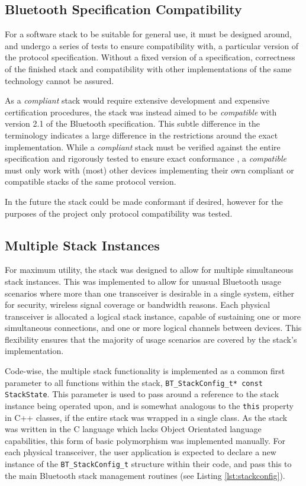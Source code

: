 \FloatBarrier
\subsection{Bluetooth Specification Compatibility}

For a software stack to be suitable for general use, it must be designed around, and undergo a series of tests to ensure compatibility with, a particular version of the protocol specification. Without a fixed version of a specification, correctness of the finished stack and compatibility with other implementations of the same technology cannot be assured.

As a \textit{compliant} stack would require extensive development and expensive certification procedures, the stack was instead aimed to be \textit{compatible} with version 2.1 of the Bluetooth specification. This subtle difference in the terminology indicates a large difference in the restrictions around the exact implementation. While a \textit{compliant} stack must be verified against the entire specification and rigorously tested to ensure exact conformance \cite{bt2p1specs_conformance}, a \textit{compatible} must only work with (most) other devices implementing their own compliant or compatible stacks of the same protocol version.

In the future the stack could be made conformant if desired, however for the purposes of the project only protocol compatibility was tested.

\FloatBarrier
\subsection{Multiple Stack Instances}

For maximum utility, the stack was designed to allow for multiple simultaneous stack instances. This was implemented to allow for unusual Bluetooth usage scenarios where more than one transceiver is desirable in a single system, either for security, wireless signal coverage or bandwidth reasons. Each physical transceiver is allocated a logical stack instance, capable of sustaining one or more simultaneous connections, and one or more logical channels between devices. This flexibility ensures that the majority of usage scenarios are covered by the stack's implementation.

Code-wise, the multiple stack functionality is implemented as a common first parameter to all functions within the stack, \lstinline{BT_StackConfig_t* const StackState}. This parameter is used to pass around a reference to the stack instance being operated upon, and is somewhat analogous to the \lstinline{this} property in C++ classes, if the entire stack was wrapped in a single class. As the stack was written in the C language which lacks Object Orientated language capabilities, this form of basic polymorphism was implemented manually. For each physical transceiver, the user application is expected to declare a new instance of the \lstinline{BT_StackConfig_t} structure within their code, and pass this to the main Bluetooth stack management routines (see Listing \ref{lst:stackconfig}).

